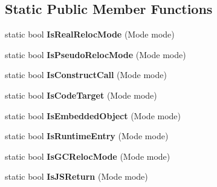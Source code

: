 \subsection*{Static Public Member Functions}
\begin{DoxyCompactItemize}
\item 
\hypertarget{classv8_1_1internal_1_1_reloc_info_a925d4626231522321411392cf0126ce0}{}static bool {\bfseries Is\+Real\+Reloc\+Mode} (Mode mode)\label{classv8_1_1internal_1_1_reloc_info_a925d4626231522321411392cf0126ce0}

\item 
\hypertarget{classv8_1_1internal_1_1_reloc_info_aca6d1f0cc52b07ed3111e4f64d6d5b85}{}static bool {\bfseries Is\+Pseudo\+Reloc\+Mode} (Mode mode)\label{classv8_1_1internal_1_1_reloc_info_aca6d1f0cc52b07ed3111e4f64d6d5b85}

\item 
\hypertarget{classv8_1_1internal_1_1_reloc_info_a9dfabfd9c0521ab0c578b1d018e09fd6}{}static bool {\bfseries Is\+Construct\+Call} (Mode mode)\label{classv8_1_1internal_1_1_reloc_info_a9dfabfd9c0521ab0c578b1d018e09fd6}

\item 
\hypertarget{classv8_1_1internal_1_1_reloc_info_a43f7e86c401d3004a4d51c7c43742310}{}static bool {\bfseries Is\+Code\+Target} (Mode mode)\label{classv8_1_1internal_1_1_reloc_info_a43f7e86c401d3004a4d51c7c43742310}

\item 
\hypertarget{classv8_1_1internal_1_1_reloc_info_a22053c0a32e7a602ff948898fe896372}{}static bool {\bfseries Is\+Embedded\+Object} (Mode mode)\label{classv8_1_1internal_1_1_reloc_info_a22053c0a32e7a602ff948898fe896372}

\item 
\hypertarget{classv8_1_1internal_1_1_reloc_info_a31b175c3f3c5230f0eb4b9ecb5f23791}{}static bool {\bfseries Is\+Runtime\+Entry} (Mode mode)\label{classv8_1_1internal_1_1_reloc_info_a31b175c3f3c5230f0eb4b9ecb5f23791}

\item 
\hypertarget{classv8_1_1internal_1_1_reloc_info_af72572e2c923844b7cce40b08d2a504c}{}static bool {\bfseries Is\+G\+C\+Reloc\+Mode} (Mode mode)\label{classv8_1_1internal_1_1_reloc_info_af72572e2c923844b7cce40b08d2a504c}

\item 
\hypertarget{classv8_1_1internal_1_1_reloc_info_a1537e0b2c7ad89b1aaaf56a8a4e83089}{}static bool {\bfseries Is\+J\+S\+Return} (Mode mode)\label{classv8_1_1internal_1_1_reloc_info_a1537e0b2c7ad89b1aaaf56a8a4e83089}


\end{DoxyCompactItemize}
